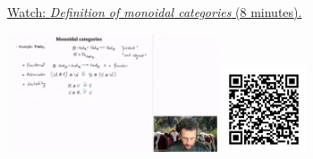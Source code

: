 
\begin{minipage}{10cm}
    \href{https://act4e-spring21.netlify.app/videos/spring2021-par-feedback:mon-cat:mon-cat-def.html}{Watch: \emph{Definition of monoidal categories} (8 minutes).}
        
    \href{https://act4e-spring21.netlify.app/videos/spring2021-par-feedback:mon-cat:mon-cat-def.html}{\includegraphics[height=3.5cm]{spring2021-par-feedback:mon-cat:mon-cat-def/thumbnails.jpg}}
    \href{https://act4e-spring21.netlify.app/videos/spring2021-par-feedback:mon-cat:mon-cat-def.html}{\includegraphics[height=2.5cm]{spring2021-par-feedback:mon-cat:mon-cat-def/qrcode.png}}
\end{minipage}
